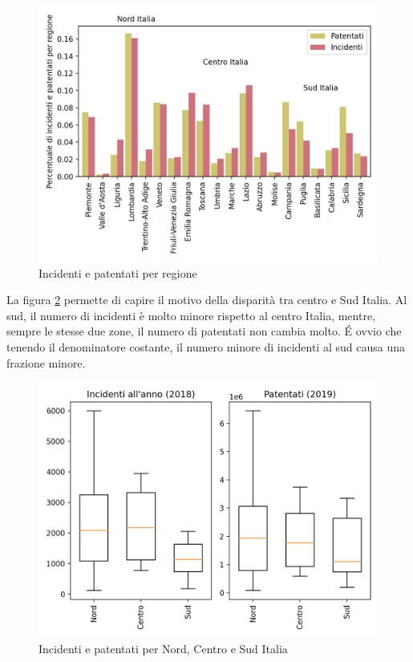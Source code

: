 \documentclass[a4paper,12pt]{report}
\begin{document}
\begin{figure}
    \includegraphics[width=\linewidth]{../src/incidenti/incidenti_aci/mappe_regioni/incidenti_patenti_bar.png}
    \caption{Incidenti e patentati per regione}
    \label{fig:incidenti-patentati-bar}
\end{figure}

La figura \ref{fig:incidenti-patentati-box} permette di capire il motivo della disparità 
tra centro e Sud Italia.
Al sud, il numero di incidenti è molto minore rispetto al centro Italia, mentre, 
sempre le stesse due zone, il numero di patentati non cambia molto. 
\'E ovvio che tenendo il denominatore costante, il numero minore di incidenti al 
sud causa una frazione minore.

\begin{figure}
    \includegraphics[width=\linewidth]{../src/incidenti/incidenti_aci/mappe_regioni/incidenti_patenti_box.png}
    \caption{Incidenti e patentati per Nord, Centro e Sud Italia}
    \label{fig:incidenti-patentati-box}
\end{figure}
\end{document}
